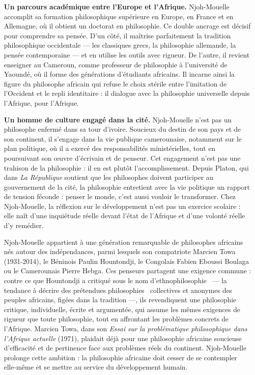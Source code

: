 \documentclass[11pt]{article}
\newcommand{\cle}[1]{{\popxbold\color{popdark}#1}}
\begin{document}
\textbf{Un parcours académique entre l'Europe et l'Afrique.} Njoh-Mouelle accomplit sa formation philosophique supérieure en Europe, en France et en Allemagne, où il obtient un doctorat en philosophie. Ce double ancrage est décisif pour comprendre sa pensée. D'un côté, il maîtrise parfaitement la tradition philosophique occidentale — les classiques grecs, la philosophie allemande, la pensée contemporaine — et en utilise les outils avec rigueur. De l'autre, il revient enseigner au Cameroun, comme professeur de philosophie à l'université de Yaoundé, où il forme des générations d'étudiants africains. Il incarne ainsi la figure du philosophe africain qui refuse le choix stérile entre l'imitation de l'Occident et le repli identitaire : il dialogue avec la philosophie universelle depuis l'Afrique, pour l'Afrique.

\textbf{Un homme de culture engagé dans la cité.} Njoh-Mouelle n'est pas un philosophe enfermé dans sa tour d'ivoire. Soucieux du destin de son pays et de son continent, il s'engage dans la vie publique camerounaise, notamment sur le plan politique, où il a exercé des responsabilités ministérielles, tout en poursuivant son œuvre d'écrivain et de penseur. Cet engagement n'est pas une trahison de la philosophie : il en est plutôt l'accomplissement. Depuis Platon, qui dans \emph{La République} soutient que les philosophes doivent participer au gouvernement de la cité, la philosophie entretient avec la vie politique un rapport de tension féconde : penser le monde, c'est aussi vouloir le transformer. Chez Njoh-Mouelle, la réflexion sur le développement n'est pas un exercice scolaire : elle naît d'une inquiétude réelle devant l'état de l'Afrique et d'une volonté réelle d'y remédier.

\begin{savaistu}
Njoh-Mouelle appartient à une génération remarquable de philosophes africains nés autour des indépendances, parmi lesquels son compatriote Marcien Towa (1931-2014), le Béninois Paulin Hountondji, le Congolais Fabien Eboussi Boulaga ou le Camerounais Pierre Hebga. Ces penseurs partagent une exigence commune : contre ce que Hountondji a critiqué sous le nom d'\guillemotleft ethnophilosophie \guillemotright\ — la tendance à décrire des prétendues \guillemotleft philosophies \guillemotright\ collectives et anonymes des peuples africains, figées dans la tradition —, ils revendiquent une philosophie \cle{critique}, individuelle, écrite et argumentée, qui assume les mêmes exigences de rigueur que toute philosophie, tout en affrontant les problèmes concrets de l'Afrique. Marcien Towa, dans son \emph{Essai sur la problématique philosophique dans l'Afrique actuelle} (1971), plaidait déjà pour une philosophie africaine soucieuse d'efficacité et de pertinence face aux problèmes réels du continent. Njoh-Mouelle prolonge cette ambition : la philosophie africaine doit cesser de se contempler elle-même et se mettre au service du développement humain.
\end{savaistu}
\end{document}

